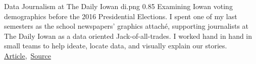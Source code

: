 \cvexample
  {Data Journalism at The Daily Iowan}
  {di.png}
  {0.85}
  {%
    Examining Iowan voting demographics before the 2016 Presidential Elections.
    I spent one of my last semesters as the school newspapers' graphics attaché, supporting journalists at The Daily Iowan as a data oriented Jack-of-all-trades.
    I worked hand in hand in small teams to help ideate, locate data, and visually explain our stories.\\
    \raggedleft\href{http://daily-iowan.com/2016/11/02/el-voto/}{Article},\, \href{https://github.com/ryan-p-larson/DI-Hisp}{Source}\quad
  }